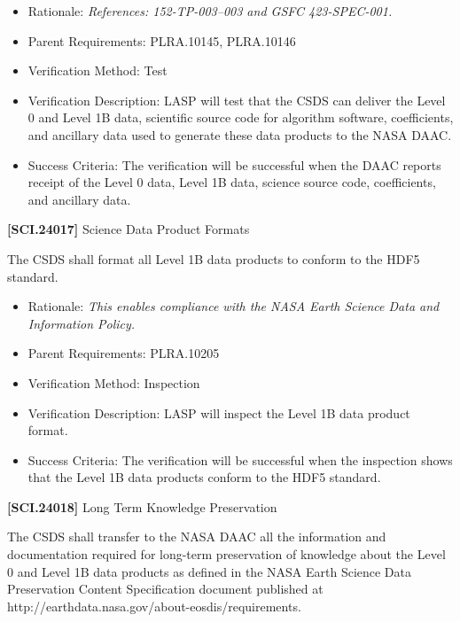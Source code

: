 \documentclass[12pt,oneside,oldfontcommands]{memoir}
\begin{document}
\begin{itemize}
\item{} Rationale: \emph{References: 152-TP-003--003 and GSFC 423-SPEC-001.}

\item{} Parent Requirements: PLRA.10145, PLRA.10146

\item{} Verification Method: Test

\item{} Verification Description: \gls{LASP} will \gls{test} that the \gls{CSDS} can deliver the Level 0 and Level 1B data, scientific source code for algorithm software, coefficients, and ancillary data used to generate these data products to the NASA \gls{DAAC}.

\item{} Success Criteria: The verification will be successful when the \gls{DAAC} reports receipt of the Level 0 data, Level 1B data, science source code, coefficients, and ancillary data.

\end{itemize}

\textbf{[SCI.24017]} Science Data Product Formats

The \gls{CSDS} shall format all Level 1B data products to conform to the HDF5 standard.

\begin{itemize}
\item{} Rationale: \emph{This enables compliance with the NASA Earth Science Data and Information Policy.}

\item{} Parent Requirements: PLRA.10205

\item{} Verification Method: Inspection

\item{} Verification Description: \gls{LASP} will inspect the Level 1B data product format.

\item{} Success Criteria: The verification will be successful when the \gls{inspection} shows that the Level 1B data products conform to the HDF5 standard.

\end{itemize}

\textbf{[SCI.24018]} Long Term Knowledge Preservation

The \gls{CSDS} shall transfer to the NASA \gls{DAAC} all the information and documentation required for long-term preservation of knowledge about the Level 0 and Level 1B data products as defined in the NASA Earth Science Data Preservation Content Specification document published at http:\slash \slash earthdata.nasa.gov\slash about-eosdis\slash requirements.
\end{document}
